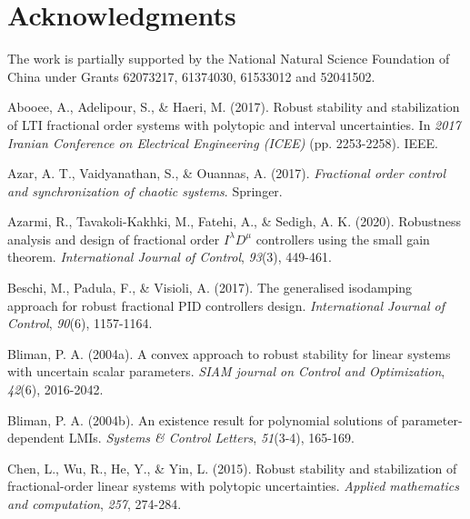 \documentclass[]{interact}
\theoremstyle{plain}%
\theoremstyle{definition}
\theoremstyle{remark}
\begin{document}
\section*{Acknowledgments}
\par The work is partially supported by the National Natural Science Foundation of China under Grants 62073217, 61374030, 61533012 and 52041502.
\begin{thebibliography}{}

	Abooee, A., Adelipour, S., \& Haeri, M. (2017). Robust stability and stabilization of LTI fractional order systems with polytopic and interval uncertainties. In \emph{2017 Iranian Conference on Electrical Engineering (ICEE)} (pp. 2253-2258). IEEE.
	
	
	Azar, A. T., Vaidyanathan, S., \& Ouannas, A. (2017). \emph{Fractional order control and synchronization of chaotic systems}. Springer.
	
	Azarmi, R., Tavakoli-Kakhki, M., Fatehi, A., \& Sedigh, A. K. (2020). Robustness analysis and design of fractional order $I^\lambda D^\mu$ controllers using the small gain theorem. \emph{International Journal of Control}, \emph{93}(3), 449-461. 
	
	Beschi, M., Padula, F., \& Visioli, A. (2017). The generalised isodamping approach for robust fractional PID controllers design. \emph{International Journal of Control}, \emph{90}(6), 1157-1164. 
	
	Bliman, P. A. (2004a). A convex approach to robust stability for linear systems with uncertain scalar parameters. \emph{SIAM journal on Control and Optimization}, \emph{42}(6), 2016-2042.
	
	Bliman, P. A. (2004b). An existence result for polynomial solutions of parameter-dependent LMIs. \emph{Systems \& Control Letters}, \emph{51}(3-4), 165-169.
	
	Chen, L., Wu, R., He, Y., \& Yin, L. (2015). Robust stability and stabilization of fractional-order linear systems with polytopic uncertainties. \emph{Applied mathematics and computation}, \emph{257}, 274-284. 
	

\end{thebibliography}
\end{document}

